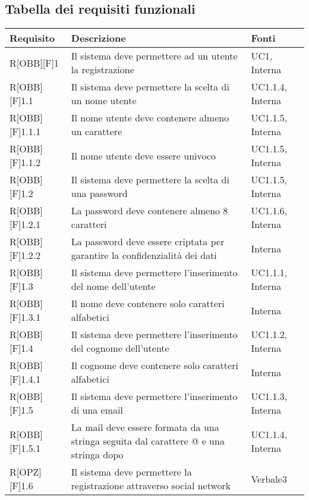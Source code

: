 \subsection{Tabella dei requisiti funzionali}
	\begin{table}[h]
		\begin{tabular}{|p{}|p{}|p{}|}
			\toprule
			
			\textbf{Requisito} & \textbf{Descrizione} & \textbf{Fonti} \\
			
			\midrule

			R[OBB][F]1 & Il sistema deve permettere ad un utente la registrazione & UC1, Interna \\ \midrule
			R[OBB][F]1.1 & Il sistema deve permettere la scelta di un nome utente & UC1.1.4, Interna \\ \midrule
			R[OBB][F]1.1.1 & Il nome utente deve contenere almeno un carattere & UC1.1.5, Interna \\ \midrule
			R[OBB][F]1.1.2 & Il nome utente deve essere univoco & UC1.1.5, Interna \\ \midrule
			R[OBB][F]1.2 & Il sistema deve permettere la scelta di una password & UC1.1.5, Interna \\ \midrule
			R[OBB][F]1.2.1 & La password deve contenere almeno 8 caratteri & UC1.1.6, Interna \\ \midrule
			R[OBB][F]1.2.2 & La password deve essere criptata per garantire la confidenzialità dei dati & Interna \\ \midrule
			R[OBB][F]1.3 & Il sistema deve permettere l'inserimento del nome dell'utente & UC1.1.1, Interna \\ \midrule
			R[OBB][F]1.3.1 & Il nome deve contenere solo caratteri alfabetici & Interna \\ \midrule
			R[OBB][F]1.4 & Il sistema deve permettere l'inserimento del cognome dell'utente & UC1.1.2, Interna \\ \midrule
			R[OBB][F]1.4.1 & Il cognome deve contenere solo caratteri alfabetici & Interna \\ \midrule
			R[OBB][F]1.5 & Il sistema deve permettere l'inserimento di una email & UC1.1.3, Interna \\ \midrule
			R[OBB][F]1.5.1 & La mail deve essere formata da una stringa seguita dal carattere @ e una stringa dopo & UC1.1.4, Interna \\ \midrule
			R[OPZ][F]1.6 & Il sistema deve permettere la registrazione attraverso social network & Verbale3 \\ \midrule

\end{tabular}
\end{table}

